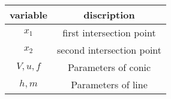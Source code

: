 \begin{tabular}[12pt]{|c|c|}
     \hline
     {variable} & {discription}\\
     \hline
     $x_1$ & first intersection point\\
     \hline
     $x_2$ & second intersection point\\
     \hline
     $V,u,f$ & Parameters of conic\\
     \hline
    $h,m$ & Parameters of line\\
    \hline

     
\end{tabular}